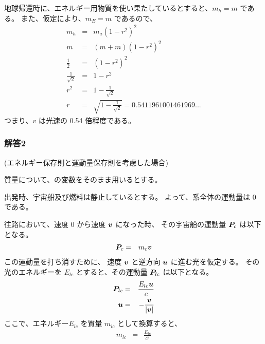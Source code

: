 地球帰還時に、エネルギー用物質を使い果たしているとすると、$m_h = m$ である。
また、仮定により、$m_E = m$ であるので、
  \begin{eqnarray}
    m_h & = & m_a(1 - r^2)^2
  \\
    m & = & (m + m) (1-r^2)^2
  \\
    \frac{1}{2} & = & (1-r^2)^2
  \\
    \frac{1}{\sqrt{2}} & = & 1-r^2
  \\
    r^2 & = & 1 - \frac{1}{\sqrt{2}}
  \\
    r & = & \sqrt{1 - \frac{1}{\sqrt{2}}} = 0.5411961001461969...
  \end{eqnarray}
つまり、$v$ は光速の 0.54 倍程度である。

\subsubsection{解答2}
\label{sssec:宇宙船の加速:解答2}
(エネルギー保存則と運動量保存則を考慮した場合)

質量について、の変数をそのまま用いるとする。

出発時、宇宙船及び燃料は静止しているとする。
よって、系全体の運動量は 0 である。

往路において、速度 0 から速度 ${\bm{v}}$ になった時、
その宇宙船の運動量 ${\bm{P}}_c$ は以下となる。
  \begin{eqnarray}
    {\bm{P}}_c & = & m_c {\bm{v}}
  \label{eq:P-c-m-c-v}
  \end{eqnarray}
この運動量を打ち消すために、
速度 ${\bm{v}}$ と逆方向 ${\bm{u}}$ に進む光を仮定する。
その光のエネルギーを $E_{lc}$ とすると、その運動量 ${\bm{P}}_{lc}$ は以下となる。
  \begin{eqnarray}
    {\bm{P}}_{lc} & = & \frac{E_{lc} {\bm{u}}}{c}
  \\
    {\bm{u}} & = & - \frac{{\bm{v}}}{\left| {\bm{v}} \right|}
  \end{eqnarray}
ここで、エネルギー$E_{lc}$ を質量 $m_{lc}$ として換算すると、
  \begin{eqnarray}
    m_{lc} & = & \frac{E_{lc}}{c^2}
  \end{eqnarray}

